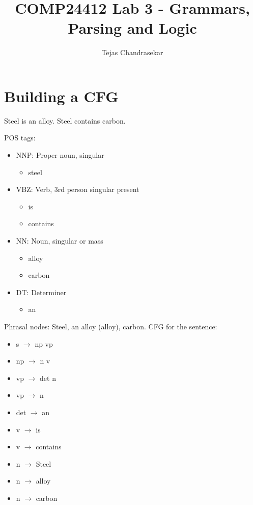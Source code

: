 \documentclass[12pt]{report}
\title{COMP24412 Lab 3 - Grammars, Parsing and Logic}
\author{Tejas Chandrasekar}
\begin{document}
\maketitle
\newpage

\section{Building a CFG}
Steel is an alloy. Steel contains carbon.\par
\noindent POS tags:
\begin{itemize}
  \item NNP: Proper noun, singular
  \begin{itemize}
    \item steel
  \end{itemize}
  \item VBZ: Verb, 3rd person singular present
  \begin{itemize}
    \item is
    \item contains
  \end{itemize}
  \item NN: Noun, singular or mass
  \begin{itemize}
    \item alloy
    \item carbon
  \end{itemize}
  \item DT: Determiner
  \begin{itemize}
    \item an
  \end{itemize}
\end{itemize}
Phrasal nodes: Steel, an alloy (alloy), carbon.
CFG for the sentence:
\begin{itemize}
  \item s $\rightarrow$ np vp
  \item np $\rightarrow$ n v
  \item vp $\rightarrow$ det n
  \item vp $\rightarrow$ n
  \item det $\rightarrow$ an
  \item v $\rightarrow$ is
  \item v $\rightarrow$ contains
  \item n $\rightarrow$ Steel
  \item n $\rightarrow$ alloy
  \item n $\rightarrow$ carbon
\end{itemize}
\end{document}
